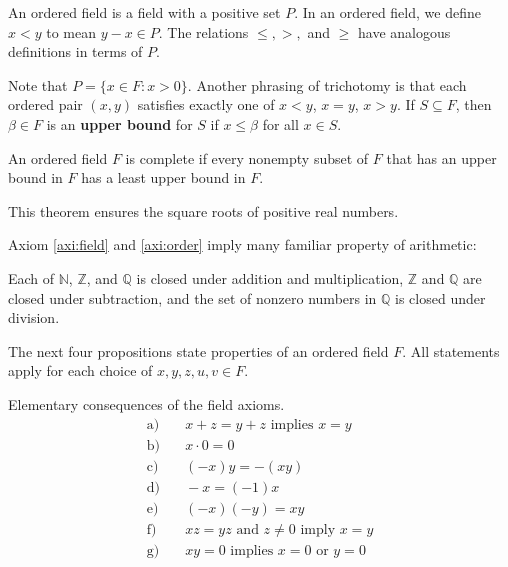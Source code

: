 \documentclass[
	12pt, %
	fleqn, %
	a4paper, %
]{LegrandOrangeBook}
\begin{document}
\begin{enumerate}
\begin{definition}
An ordered field is a field with a positive set \( P \). In an ordered field, we define \( x < y \) to mean \( y - x \in P \). The relations \( \leq, >, \) and \( \geq \) have analogous definitions in terms of \( P \).

Note that \( P = \{ x \in F : x > 0\} \). Another phrasing of trichotomy is that each ordered pair \( (x, y) \) satisfies exactly one of \( x < y \), \( x = y \), \( x > y \).
If \( S \subseteq F \), then \( \beta \in F \) is an \textbf{upper bound} for \( S \) if \( x \leq \beta \) for all \( x \in S \).
\end{definition}
\begin{definition}
     An ordered field \( F \) is complete if every nonempty subset of \( F \) that has an upper bound in \( F \) has a least upper bound in \( F \).
\end{definition}

    This theorem ensures the square roots of positive real numbers.

\end{enumerate}

Axiom \autoref{axi:field} and \autoref{axi:order} imply many familiar property of arithmetic:

\begin{proposition}
Each of $\mathbb{N}$, $\mathbb{Z}$, and $\mathbb{Q}$ is closed under addition and multiplication, $\mathbb{Z}$ and $\mathbb{Q}$ are closed under subtraction, and the set of nonzero numbers in $\mathbb{Q}$ is closed under division.
\end{proposition}

The next four propositions state properties of an ordered field $F$. All statements apply for each choice of $x, y, z, u, v \in F$.

\begin{proposition}
Elementary consequences of the field axioms.
\begin{align*}
    \text{a)} &\quad x + z = y + z \text{ implies } x = y \\
    \text{b)} &\quad x \cdot 0 = 0 \\
    \text{c)} &\quad (-x)y = -(xy) \\
    \text{d)} &\quad -x = (-1)x \\
    \text{e)} &\quad (-x)(-y) = xy \\
    \text{f)} &\quad xz = yz \text{ and } z \neq 0 \text{ imply } x = y \\
    \text{g)} &\quad xy = 0 \text{ implies } x = 0 \text{ or } y = 0
\end{align*}
\end{proposition}
\end{document}

